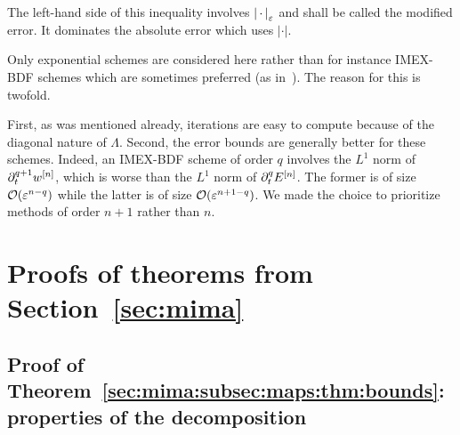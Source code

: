 The left-hand side of this inequality involves $\left\vert  \, \cdot \,  \right\vert _{\varepsilon}$ 
and shall be called the modified error. 
It dominates the absolute error which uses $| \cdot |$. 

\begin{remark} \label{mima_rq:imex}
Only exponential schemes are considered here rather than for instance 
IMEX-BDF schemes which are sometimes preferred (as in~\cite{hu.2021.uniform}). 
The reason for this is twofold. 

First, as was mentioned already, iterations are easy to compute because 
of the diagonal nature of $\Lambda$. 
Second, %
the error bounds are generally better for these schemes. 
Indeed, an IMEX-BDF scheme of order $q$ involves the $L^1$ norm of $\partial_t^{q+1} w^{[n]}$, 
which is worse than the $L^1$ norm of $\partial_t^q E^{[n]}$. 
The former is of size $\mathcal{O}(\varepsilon^{n-q})$ while the latter is of size $\mathcal{O}(\varepsilon^{n+1-q})$.
We made the choice to prioritize methods of order $n+1$ rather than $n$.
\end{remark}









\section{Proofs of theorems from Section~\ref{sec:mima}} 
\label{sec:proofs}






\subsection{Proof of Theorem~\ref{sec:mima:subsec:maps:thm:bounds}:
properties of the decomposition}
\label{sec:proofs:subsec:bounds}


